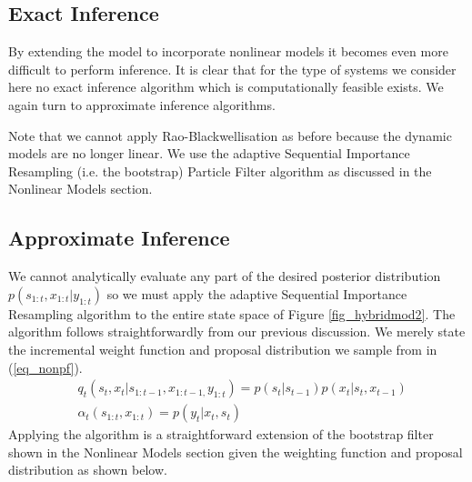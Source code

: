 \documentclass[../masters.tex]{subfiles}
\begin{document}
\subsection{Exact Inference}
By extending the model to incorporate nonlinear models it becomes even more difficult to perform inference. It is clear that for the type of systems we consider here no exact inference algorithm which is computationally feasible exists. We again turn to approximate inference algorithms.

Note that we cannot apply Rao-Blackwellisation as before because the dynamic models are no longer linear. We use the adaptive Sequential Importance Resampling (i.e. the bootstrap) Particle Filter algorithm as discussed in the Nonlinear Models section.

\subsection{Approximate Inference}
We cannot analytically evaluate any part of the desired posterior distribution $p(s_{1:t}, x_{1:t}|y_{1:t})$ so we must apply the adaptive Sequential Importance Resampling algorithm to the entire state space of Figure \ref{fig_hybridmod2}. The algorithm follows straightforwardly from our previous discussion. We merely state the incremental weight function and proposal distribution we sample from in (\ref{eq_nonpf}). 
\begin{equation}
\begin{aligned}
&q_t(s_t,x_t|s_{1:t-1},x_{1:t-1,}y_{1:t}) = p(s_t|s_{t-1})p(x_t|s_t,x_{t-1}) \\
&\alpha_t(s_{1:t},x_{1:t}) = p(y_t|x_t,s_t)
\end{aligned}
\label{eq_nonpf}
\end{equation}  
Applying the algorithm is a straightforward extension of the bootstrap filter shown in the Nonlinear Models section given the weighting function and proposal distribution as shown below.
\end{document}
